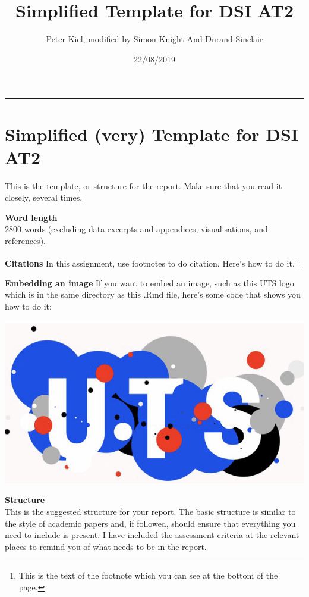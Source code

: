 \documentclass[
]{article}
\title{Simplified Template for DSI AT2}
\subtitle{Peter Kiel, modified by Simon Knight And Durand Sinclair}
\author{}
\date{\vspace{-2.5em}22/08/2019}
\begin{document}
\maketitle

{
\setcounter{tocdepth}{2}
\tableofcontents
}
\begin{center}\rule{0.5\linewidth}{0.5pt}\end{center}

\hypertarget{simplified-very-template-for-dsi-at2}{%
\section{Simplified (very) Template for DSI
AT2}\label{simplified-very-template-for-dsi-at2}}

This is the template, or structure for the report. Make sure that you
read it closely, several times.

\textbf{Word length}\\
2800 words (excluding data excerpts and appendices, visualisations, and
references).

\textbf{Citations} In this assignment, use footnotes to do citation.
Here's how to do it. \footnote{This is the text of the footnote which
  you can see at the bottom of the page.}

\textbf{Embedding an image} If you want to embed an image, such as this
UTS logo which is in the same directory as this .Rmd file, here's some
code that shows you how to do it:

\includegraphics{uts_logo_new.png}

\textbf{Structure}\\
This is the suggested structure for your report. The basic structure is
similar to the style of academic papers and, if followed, should ensure
that everything you need to include is present. I have included the
assessment criteria at the relevant places to remind you of what needs
to be in the report.
\end{document}
